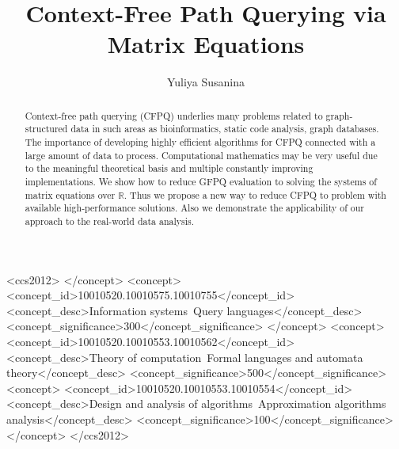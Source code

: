 \documentclass[sigconf]{acmart}
\begin{document}
\title{Context-Free Path Querying via Matrix Equations}

\author{Yuliya Susanina}





\begin{abstract}
  Context-free path querying (CFPQ) underlies many problems related to graph-structured data in such areas as bioinformatics, static code analysis, graph databases.
  The importance of developing highly efficient algorithms for CFPQ connected with a large amount of data to process.
  Computational mathematics may be very useful due to the meaningful theoretical basis and multiple constantly improving implementations.
  We show how to reduce GFPQ evaluation to solving the systems of matrix equations over $\mathbb{R}$.
  Thus we propose a new way to reduce CFPQ to problem with available high-performance solutions.
  Also we demonstrate the applicability of our approach to the real-world data analysis.
\end{abstract}

\begin{CCSXML}
<ccs2012>
 </concept>
 <concept>
  <concept_id>10010520.10010575.10010755</concept_id>
  <concept_desc>Information systems~Query languages</concept_desc>
  <concept_significance>300</concept_significance>
 </concept>
 <concept>
  <concept_id>10010520.10010553.10010562</concept_id>
  <concept_desc>Theory of computation~Formal languages and automata theory</concept_desc>
  <concept_significance>500</concept_significance>
 <concept>
  <concept_id>10010520.10010553.10010554</concept_id>
  <concept_desc>Design and analysis of algorithms~Approximation algorithms analysis</concept_desc>
  <concept_significance>100</concept_significance>
 </concept>
</ccs2012>
\end{CCSXML}
\end{document}
